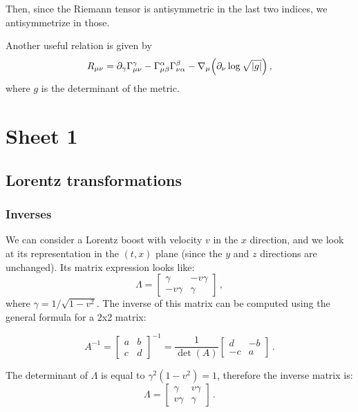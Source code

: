 \documentclass[main.tex]{subfiles}
\begin{document}
Then, since the Riemann tensor is antisymmetric in the last two indices, we antisymmetrize in those. 

Another useful relation is given by 
%
\begin{align}
  R_{\mu \nu } = \partial_{\gamma } \Gamma^{\gamma }_{\mu \nu } - \Gamma^{\alpha }_{\mu \beta } \Gamma^{\beta }_{\nu \alpha } - \nabla_{\mu } \qty(\partial_{\nu } \log \sqrt{ \abs{g}})
\,,
\end{align}
%
where \(g\) is the determinant of the metric. 

\section{Sheet 1}

\subsection{Lorentz transformations }

\subsubsection{Inverses}

We can consider a Lorentz boost with velocity $v$ in the $x$ direction, and we look at its representation in the $(t, x)$ plane (since the $y$ and $z$ directions are unchanged). Its matrix expression looks like:
%
\begin{equation}\label{LorBoost}
    \Lambda = \begin{bmatrix}
        \gamma & -v \gamma \\
        -v \gamma & \gamma
    \end{bmatrix}\,,
\end{equation}
%
where $\gamma = 1 / \sqrt{1 - v^2}$. The inverse of this matrix can be computed using the general formula for a 2x2 matrix:

\begin{equation}
    A^{-1}=
    \begin{bmatrix}
        a & b \\
        c & d
    \end{bmatrix}^{-1}
    =
    \frac{1}{\det(A)}
        \begin{bmatrix}
        d & -b \\
        -c & a
    \end{bmatrix}\,.
\end{equation}

The determinant of $\Lambda $ is equal to $\gamma^2 (1-v^2) = 1$, therefore the inverse matrix is:
%
\begin{equation}
    \Lambda = \begin{bmatrix}
        \gamma & v \gamma \\
        v \gamma & \gamma
    \end{bmatrix}\,.
\end{equation}
\end{document}
